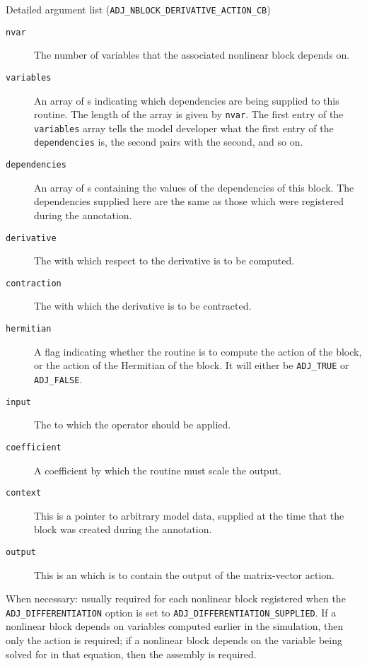 \begin{boxwithtitle}{Detailed argument list (\texttt{ADJ_NBLOCK_DERIVATIVE_ACTION_CB})}
\begin{description}
\item[\texttt{nvar}] The number of variables that the associated nonlinear block depends on.
\item[\texttt{variables}] An array of s indicating which dependencies are being supplied to this routine. The length of the
array is given by \texttt{nvar}. The first entry of the \texttt{variables} array
tells the model developer what the first entry of the \texttt{dependencies} is, the second pairs with the second, and so on.
\item[\texttt{dependencies}] An array of s containing the values of the dependencies of this block. The dependencies supplied
here are the same as those which were registered during the annotation.
\item[\texttt{derivative}] The  with which respect to the derivative is to be computed. %
\item[\texttt{contraction}] The  with which the derivative is to be contracted.  
\item[\texttt{hermitian}] A flag indicating whether the routine is to compute the action of the block, or the action of the Hermitian of the
block. It will either be \texttt{ADJ_TRUE} or \texttt{ADJ_FALSE}.
\item[\texttt{input}] The  to which the operator should be applied.
\item[\texttt{coefficient}] A coefficient by which the routine must scale the output.
\item[\texttt{context}] This is a pointer to arbitrary model data, supplied at the time that the block was created during the annotation.
\item[\texttt{output}] This is an  which is to contain the output of the matrix-vector action.
\end{description}
\end{boxwithtitle}

When necessary: usually required for each nonlinear block registered when the
\texttt{ADJ_DIFFERENTIATION} option is set to \texttt{ADJ_DIFFERENTIATION_SUPPLIED}.  %
If a nonlinear
block depends on variables computed earlier in the simulation, then only the action is
required; if a nonlinear block depends on the variable being solved for in that equation,
then the assembly is required.

